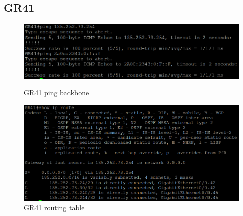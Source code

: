 \documentclass{article}
\begin{document}
\subsection{GR41}
\begin{figure}[!htp]
  \centering
  \begin{minipage}[b]{0.45\textwidth}
    \includegraphics[width=\textwidth]{Arbeitsergebnisse/GR41/gr41_ping_backbone.png}
    \caption{GR41 ping backbone}
  \end{minipage}
  \hspace{0.8cm}
  \begin{minipage}[b]{0.45\textwidth}
    \includegraphics[width=\textwidth]{Arbeitsergebnisse/GR41/gr41_routing_table.png}
    \caption{GR41 routing table}
  \end{minipage}
\end{figure}
\end{document}
